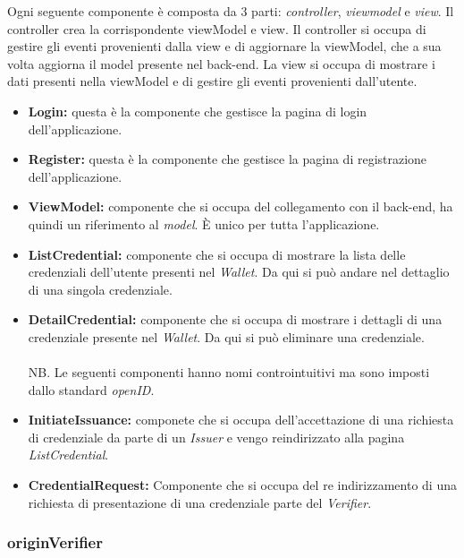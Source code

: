 Ogni seguente componente è composta da 3 parti: \textit{controller}, \textit{viewmodel} e \textit{view}. Il controller crea la corrispondente
viewModel e view. Il controller si occupa di gestire gli eventi provenienti dalla view e di aggiornare la viewModel, che a sua volta aggiorna 
il model presente nel back-end. La view si occupa di mostrare i dati presenti nella viewModel e di gestire gli eventi provenienti dall'utente.

\begin{itemize}      
    \item \textbf{Login:} questa è la componente che gestisce la pagina di login dell'applicazione. 
    \item \textbf{Register:} questa è la componente che gestisce la pagina di registrazione dell'applicazione.
    \item \textbf{ViewModel:} componente che si occupa del collegamento con il back-end, ha quindi un riferimento al \textit{model}. È unico per tutta l'applicazione.
    \item \textbf{ListCredential:} componente che si occupa di mostrare la lista delle credenziali dell'utente presenti nel \textit{Wallet}. Da qui si può andare nel dettaglio di una singola credenziale.
    \item \textbf{DetailCredential:} componente che si occupa di mostrare i dettagli di una credenziale presente nel \textit{Wallet}. Da qui si può eliminare una credenziale.\\
    \\NB. Le seguenti componenti hanno nomi controintuitivi ma sono imposti dallo standard \textit{openID}.
    \item \textbf{InitiateIssuance:} componete che si  occupa dell'accettazione di una richiesta di credenziale da parte di un \textit{Issuer} e vengo reindirizzato alla pagina \textit{ListCredential}.
    \item \textbf{CredentialRequest:} Componente che si occupa del re indirizzamento di una richiesta di presentazione di una credenziale parte del \textit{Verifier}. 
\end{itemize}
\subsubsection{originVerifier}

